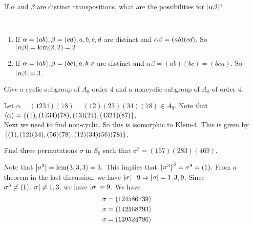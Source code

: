 \begin{exercise}
    If $\alpha$ and $\beta$ are distinct transpositions, what are the possibilities for $\qty|\alpha \beta|$?
\end{exercise}

\begin{solution} \phantom{blank} \\
    \begin{myspace}
        \begin{enumerate}[label=\textbf{Case \arabic*:}]
            \item If $\alpha = \qty(ab), \beta = \qty(cd), a, b, c, d$ are distinct and $\alpha \beta = \qty(ab) \qty(cd)$. So $\qty|\alpha \beta| = \text{lcm}(2, 2) = 2$
            \item If $\alpha = \qty(ab), \beta = \qty(bc), a, b, c$ are distinct and $\alpha \beta = (ab)(bc) = (bca)$. So $\qty|\alpha \beta| = 3$.
        \end{enumerate}
    \end{myspace}
\end{solution}

\begin{exercise}
    Give a cyclic subgroup of $A_8$ order 4 and a noncyclic subgroup of $A_8$ of order 4. 
\end{exercise}

\begin{solution}
    Let $\alpha = (1234)(78) = (12)(23)(34)(78) \in A_8$. Note that $\langle \alpha \rangle = \qty{(1), \qty(1234)(78), (13)(24), (4321)(87)}$. \\
    
    Next we need to find non-cyclic. So this is isomorphic to Klein-4. This is given by $\qty{(1), (12)(34), (56)(78), (12)(34)(56)(78)}$.
\end{solution}

\begin{exercise}
    Find three permutations $\sigma$ in $S_9$ such that $\sigma^3 = (157)(283)(469)$.
\end{exercise}

\begin{solution}
    Note that $\qty|\sigma^3| = \text{lcm}(3,3,3) = 3$. This implies that $\qty(\sigma^3)^3 = \sigma^9 = (1)$. From a theorem in the last discussion, we have $\qty|\sigma| \mid 9 \Rightarrow \qty|\sigma| = 1, 3, 9$. Since $\sigma^3 \neq \qty(1), \qty|\sigma| \neq 1, 3$, we have $\qty|\sigma| = 9$. We have
        \begin{align*}
            \sigma &= \qty(124586739) \\
            \sigma &= \qty(142568793) \\
            \sigma &= \qty(139524786)
        \end{align*}
\end{solution}

